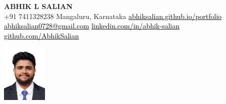 \documentclass{resume} %
\begin{document}
\begin{minipage}[t]{0.745\textwidth}
    \vspace{-0.6in}
    \LARGE \textbf{ABHIK L SALIAN} 
    \vspace{0.3cm}
    \\
    \normalsize
    +91 7411328238 \textbar{} 
    Mangaluru, Karnataka \textbar{}
    \href{https://abhiksalian.github.io/portfolio/}{\textcolor{black}{abhiksalian.github.io/portfolio}} 
    \vspace{0.15cm}
    \\
    \href{mailto:abhiksalian0728@gmail.com}{\textcolor{black}{abhiksalian0728@gmail.com}} \textbar{}
    \href{https://linkedin.com/in/abhik-salian}{\textcolor{black}{linkedin.com/in/abhik-salian}} \textbar{}
    \href{https://www.github.com/AbhikSalian}{\textcolor{black}{github.com/AbhikSalian}}
\end{minipage}
\begin{minipage}[t]{0.25\textwidth}
    \vspace{-0.8in}
    \begin{flushright}
        \includegraphics[width=0.85in]{Abhik_L_Salian.png} %
    \end{flushright}
\end{minipage}


\end{document}
